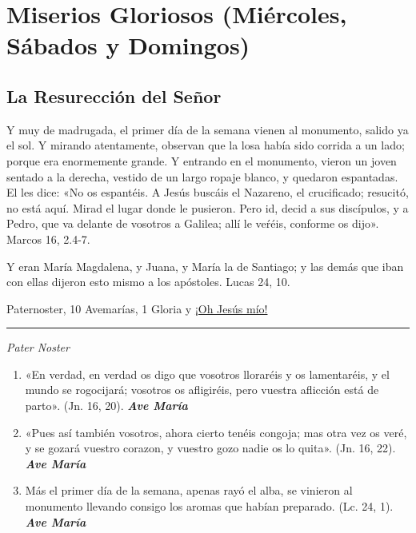 \documentclass[a4paper,11pt, oneside]{report}
\begin{document}
\section*{Miserios Gloriosos (Miércoles, Sábados y Domingos)}\label{sec:gloriosos}
{
  \subsection*{La Resurección del Señor}
    {
      Y muy de madrugada, el primer día de la semana vienen al monumento, salido ya el sol. Y mirando atentamente, observan que la losa había
      sido corrida a un lado; porque era enormemente grande. Y entrando en el monumento, vieron un joven sentado a la derecha, vestido de un largo
      ropaje blanco, y quedaron espantadas. El les dice: «No os espantéis. A Jesús buscáis el Nazareno, el crucificado; resucitó, no está aquí. Mirad
      el lugar donde le pusieron. Pero id, decid a sus discípulos, y a Pedro, que va delante de vosotros a Galilea; allí le veŕéis, conforme os dijo».
      Marcos 16, 2.4-7.

      \medskip
      Y eran María Magdalena, y Juana, y María la de Santiago; y las demás que iban con ellas dijeron esto mismo a los apóstoles. 
      Lucas 24, 10.

       Paternoster, 10 Avemarías, 1 Gloria y \hyperlink{finalResureccion}{¡Oh Jesús mío!}

      \begin{center}\rule{1\linewidth}{\linethickness}\end{center}

      \medskip
      \textit{Pater Noster}

      \begin{enumerate}
        
        \item «En verdad, en verdad os digo que vosotros lloraréis y os lamentaréis, y el mundo se rogocijará;
        vosotros os afligiréis, pero vuestra aflicción está de parto». (Jn. 16, 20). \textbf{\textit{Ave María}}

        \item «Pues así también vosotros, ahora cierto tenéis congoja; mas otra vez os veré, y se gozará vuestro corazon,
        y vuestro gozo nadie os lo quita». (Jn. 16, 22). \textbf{\textit{Ave María}}

        \item Más el primer día de la semana, apenas rayó el alba, se vinieron al monumento llevando consigo los aromas
        que habían preparado. (Lc. 24, 1). \textbf{\textit{Ave María}}


\end{enumerate}}}
\end{document}
